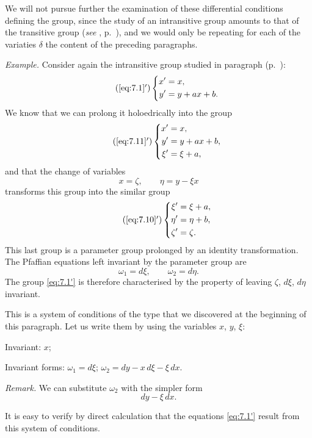 We will not pursue further the examination of these differential conditions defining the group, since the study of an intransitive group amounts to that of the transitive group (\emph{see} , p.~\pageref{sec:94}), and we would only be repeating for each of the variaties $\delta$ the content of the preceding paragraphs.

\somespace
{\small

\emph{Example.} Consider again the intransitive group studied in paragraph  (p.~\pageref{sec:104}):
\begin{equation}
  \tag{\ref{eq:7.1}$'$}
  \left\{
    \begin{aligned}
      x'&=x,\\
      y'&=y+ax+b.
    \end{aligned}
  \right.
\end{equation}
We know that we can prolong it holoedrically into the group
\begin{equation}
  \tag{\ref{eq:7.11}$'$}
  \left\{
    \begin{aligned}
      x'&=x,\\
      y'&=y+ax+b,\\
      \xi'&=\xi+a,
    \end{aligned}
  \right.
\end{equation}
and that the change of variables
\begin{equation}
  \tag{12$'$}
  x=\zeta,\qquad \eta=y-\xi x
\end{equation}
transforms this group into the similar group
\begin{equation}
  \tag{\ref{eq:7.10}$'$}
  \left\{
    \begin{aligned}
      \xi'&=\xi+a,\\
      \eta'&=\eta+b,\\
      \zeta'&=\zeta.
    \end{aligned}
  \right.
\end{equation}
This last group is a parameter group prolonged by an identity transformation. The Pfaffian equations left invariant by the parameter group are
\[
\omega_{1}=d\xi,\qquad\omega_{2}=d\eta.
\]
The group \eqref{eq:7.1'} is therefore characterised by the property of leaving $\zeta$, $d\xi$, $d\eta$ invariant.

This is a system of conditions of the type that we discovered at the beginning of this paragraph. Let us write them by using the variables $x$, $y$, $\xi$:

\somespace

Invariant: $x$;

\somespace

Invariant forms: $\omega_{1}=d\xi$; $\omega_{2}=dy-x\,d\xi-\xi\,dx$.

\somespace

\emph{Remark.} We can substitute $\omega_{2}$ with the simpler form
\[
dy-\xi\,dx.
\]

It is easy to verify by direct calculation that the equations \eqref{eq:7.1'} result from this system of conditions.
}


